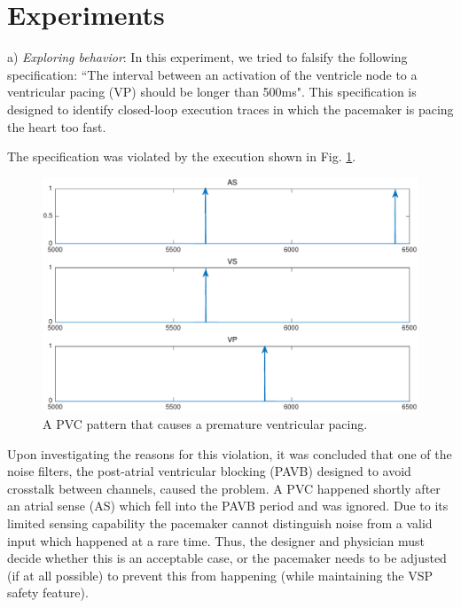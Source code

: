 \section{Experiments}
\label{experiments}

a) \emph{Exploring behavior}: In this experiment, we
tried to falsify the following specification:
``The interval between an activation of the ventricle node to a ventricular pacing (VP) should be longer than 500ms".
This specification is designed to identify closed-loop execution traces in which the pacemaker is pacing the heart too fast. %

The specification was violated by the execution shown in Fig. \ref{fig:bug8_kept1}.
\begin{figure}[tb]
\centering
\includegraphics[width=0.7\linewidth]{figures/bug8_kept1}
\caption{A PVC pattern that causes a premature ventricular pacing.}
\label{fig:bug8_kept1}
\end{figure}
Upon investigating the reasons for this violation, it was concluded that one of the noise filters, the post-atrial ventricular blocking (PAVB) designed to avoid crosstalk between channels, caused the problem.  
A PVC happened shortly after an atrial sense (AS) which fell into the PAVB period and was ignored. 
Due to its limited sensing capability the pacemaker cannot distinguish noise from a valid input which happened at a rare time.
Thus, the designer and physician must decide whether this is an acceptable case, or the pacemaker needs to be adjusted (if at all possible) to prevent this from happening (while maintaining the VSP safety feature).

